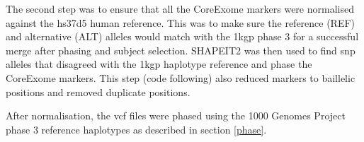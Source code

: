 \documentclass[twoside,openright]{report}
\newenvironment{Shaded}{\begin{snugshade}}{\end{snugshade}}
\newcommand{\StringTok}[1]{\textcolor[rgb]{0.31,0.60,0.02}{#1}}
\newcommand{\FunctionTok}[1]{\textcolor[rgb]{0.00,0.00,0.00}{#1}}
\newcommand{\VariableTok}[1]{\textcolor[rgb]{0.00,0.00,0.00}{#1}}
\newcommand{\ExtensionTok}[1]{#1}
\newcommand{\NormalTok}[1]{#1}
\begin{document}
\begin{Shaded}
\end{Shaded}

The second step was to ensure that all the CoreExome markers were
normalised against the hs37d5 human reference. This was to make sure the
reference (REF) and alternative (ALT) alleles would match with the
\gls{1kgp} phase 3 for a successful merge after phasing and subject
selection. SHAPEIT2 was then used to find \gls{snp} alleles that
disagreed with the \gls{1kgp} haplotype reference and phase the
CoreExome markers. This step (code following) also reduced markers to
baillelic positions and removed duplicate positions.

\begin{Shaded}
\end{Shaded}

After normalisation, the \gls{vcf} files were phased using the 1000
Genomes Project phase 3 reference haplotypes as described in section
\ref{phase}.
\end{document}

